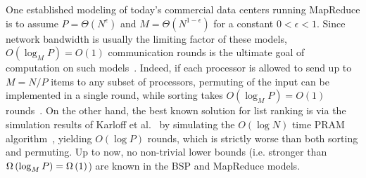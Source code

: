 \documentclass[envcountsame]{llncs}
\def\bOm#1{\printmath{\Omega \left(#1\right)}}
\begin{document}
One established modeling of today's commercial data centers running MapReduce is to assume $P = \Theta(N^\epsilon)$ and $M = \Theta(N^{1-\epsilon})$ for a constant $0< \epsilon < 1$. 
Since network bandwidth is usually the limiting factor of these models, $O(\log_M P) = O(1)$ communication rounds is the ultimate goal of computation on such models~\cite{2010KarloffMapReduce}.
Indeed, if each processor is allowed to send up to $M = N/P$ items to any subset of processors, permuting of the input can be implemented in a single round, while sorting takes $O(\log_M P) = O(1)$ rounds~\cite{1999GoodrichBSPSort,2011GoodrichMapReduceSort}.
On the other hand, the best known solution for list ranking is via the simulation results of Karloff et al.~\cite{2010KarloffMapReduce} by simulating the $O(\log N)$ time PRAM algorithm~\cite{1988AndersonMillerDetLR}, yielding $O(\log P)$ rounds, which is strictly worse than both sorting and permuting.  
Up to now, no non-trivial lower bounds (i.e. stronger than $\bOm{\log_M P} = \bOm{1}$) are known in the BSP and MapReduce models.  
\end{document}
